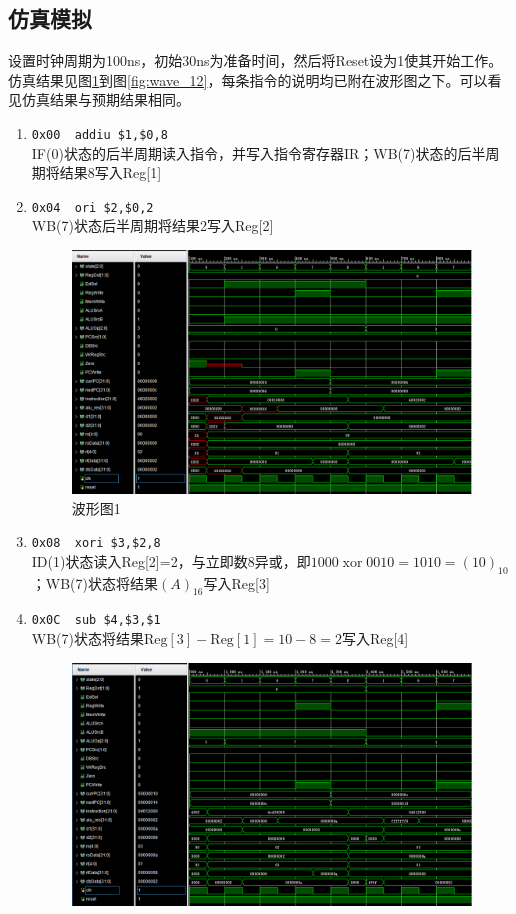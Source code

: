 
\subsection{仿真模拟}
\qquad 设置时钟周期为100ns，初始30ns为准备时间，然后将Reset设为1使其开始工作。仿真结果见图\ref{fig:wave_1}到图\ref{fig:wave_12}，每条指令的说明均已附在波形图之下。可以看见仿真结果与预期结果相同。
\begin{enumerate}
    \item \verb'0x00  addiu $1,$0,8'\\
    IF(0)状态的后半周期读入指令，并写入指令寄存器IR；WB(7)状态的后半周期将结果8写入Reg[1]
    \item \verb'0x04  ori $2,$0,2'\\
    WB(7)状态后半周期将结果2写入Reg[2]
\begin{figure}[H]
\centering
\includegraphics[width=\linewidth]{fig/FullIns/Ins1.PNG}
\caption{波形图1}
\label{fig:wave_1}
\end{figure}
    \item \verb'0x08  xori $3,$2,8'\\
    ID(1)状态读入Reg[2]=2，与立即数8异或，即$1000\;\mathrm{xor}\;0010 = 1010 = (10)_{10}$；WB(7)状态将结果$(A)_{16}$写入Reg[3]
    \item \verb'0x0C  sub $4,$3,$1'\\
    WB(7)状态将结果$\mathrm{Reg}[3]-\mathrm{Reg}[1]=10-8=2$写入Reg[4]
\begin{figure}[H]
\centering
\includegraphics[width=0.9\linewidth]{fig/FullIns/Ins2.PNG}

\end{figure}
\end{enumerate}

